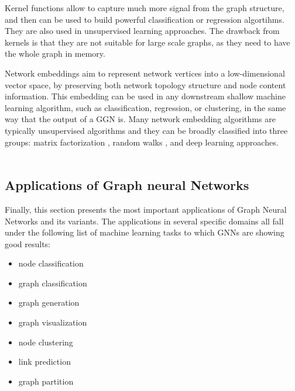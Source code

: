Kernel functions allow to capture much more signal from the graph structure, and then can be used to build powerful classification or regression algortihms. They are also used in unsupervised learning approaches. The drawback from kernels is that they are not suitable for large scale graphs, as they need to have the whole graph in memory.

 
Network embeddings aim to represent network vertices into a low-dimensional vector space, by preserving both network topology structure and node content information. This embedding can be used in any downstream shallow machine learning algorithm, such as classification, regression, or clustering, in the same way that the output of a GGN is. Many network embedding algorithms are typically unsupervised algorithms and they can be broadly classified into three groups: matrix factorization \cite{38}, random walks \cite{40}, and deep learning approaches.\\
\\











\subsection{Applications of Graph neural Networks}


Finally, this section presents the most important applications of Graph Neural Networks and its variants. The applications in several specific domains all fall under the following list of machine learning tasks to which GNNs are showing good results:
\begin{itemize}
	\item node classification
	\item graph classification
	\item graph generation
	\item graph visualization
	\item node clustering
	\item link prediction
	\item graph partition
\end{itemize}


